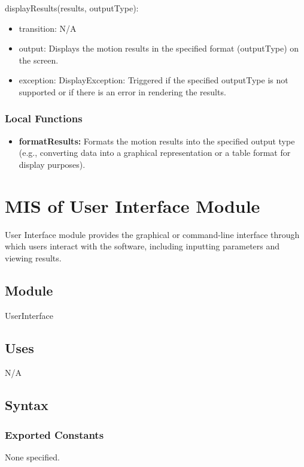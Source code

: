 \documentclass[12pt, titlepage]{article}
\begin{document}
\noindent displayResults(results, outputType):
\begin{itemize}
\item transition: N/A
\item output: Displays the motion results in the specified format (outputType) on the screen.
\item exception: DisplayException: Triggered if the specified outputType is not supported or if there is an error in rendering the results.
\end{itemize}

\subsubsection{Local Functions}

\begin{itemize}
  \item \textbf{formatResults:} Formats the motion results into the specified output type (e.g., converting data into a graphical representation or a table format for display purposes).
\end{itemize}



\section{MIS of User Interface Module} \label{mUIM}

User Interface module provides the graphical or command-line interface through which users interact
with the software, including inputting parameters and viewing results.

\subsection{Module}
UserInterface

\subsection{Uses}
N/A

\subsection{Syntax}

\subsubsection{Exported Constants}
None specified.
\end{document}
